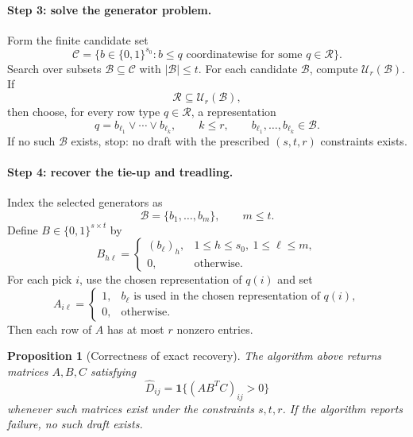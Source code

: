 \documentclass[11pt]{article}
\newtheorem{proposition}{Proposition}
\begin{document}
\paragraph{Step 3: solve the generator problem.}
Form the finite candidate set
\[
  \mathcal{C}
  =
  \{b\in\{0,1\}^{s_0}: b\le q \text{ coordinatewise for some }
  q\in\mathcal{R}\}.
\]
Search over subsets \(\mathcal{B}\subseteq\mathcal{C}\) with
\(|\mathcal{B}|\le t\). For each candidate \(\mathcal{B}\), compute
\(\mathcal{U}_r(\mathcal{B})\). If
\[
  \mathcal{R}\subseteq\mathcal{U}_r(\mathcal{B}),
\]
then choose, for every row type \(q\in\mathcal{R}\), a representation
\[
  q=b_{\ell_1}\vee\cdots\vee b_{\ell_k},
  \qquad
  k\le r,
  \qquad
  b_{\ell_1},\dots,b_{\ell_k}\in\mathcal{B}.
\]
If no such \(\mathcal{B}\) exists, stop: no draft with the prescribed
\((s,t,r)\) constraints exists.

\paragraph{Step 4: recover the tie-up and treadling.}
Index the selected generators as
\[
  \mathcal{B}=\{b_1,\dots,b_m\},
  \qquad
  m\le t.
\]
Define \(B\in\{0,1\}^{s\times t}\) by
\[
  B_{h \ell}
  =
  \begin{cases}
    (b_\ell)_h, & 1\le h\le s_0,\ 1\le \ell\le m,\\
    0, & \text{otherwise}.
  \end{cases}
\]
For each pick \(i\), use the chosen representation of \(q(i)\) and set
\[
  A_{i \ell}
  =
  \begin{cases}
    1, & b_\ell \text{ is used in the chosen representation of } q(i),\\
    0, & \text{otherwise}.
  \end{cases}
\]
Then each row of \(A\) has at most \(r\) nonzero entries.

\begin{proposition}[Correctness of exact recovery]
The algorithm above returns matrices \(A,B,C\) satisfying
\[
  \widehat{D}_{ij}
  =
  \mathbf{1}\{(AB^TC)_{ij}>0\}
\]
whenever such matrices exist under the constraints \(s,t,r\). If the algorithm
reports failure, no such draft exists.
\end{proposition}
\end{document}
